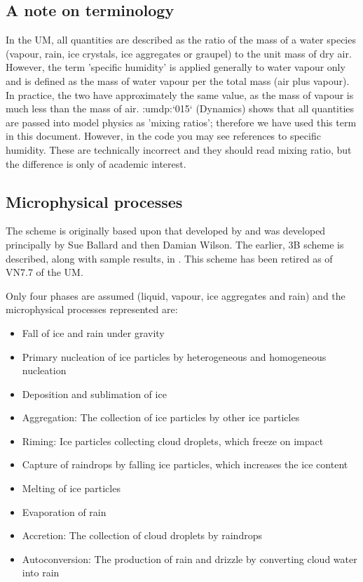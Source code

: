\documentclass{UMDP_article}
\newcommand{\citeumdp}[1]{:umdp:`#1`}
\begin{document}
\subsection{A note on terminology}
\label{sec:terms}
In the UM, all quantities are described as the ratio of the mass of a 
water species (vapour, rain, ice crystals, ice aggregates or graupel) to
the unit mass of dry air. However, the term 'specific humidity'
is applied generally to water vapour only and is defined as the mass of
water vapour per the total mass (air plus vapour). In practice, the two
have approximately the same value, as the mass of vapour is much less 
than the mass of air. \citeumdp{015} (Dynamics) shows that all quantities are
passed into model physics as 'mixing ratios'; therefore we have used this
term in this document. However, in the code you may see references to
specific humidity. These are technically incorrect and they should read
mixing ratio, but the difference is only of academic interest. 

\subsection{Microphysical processes}

The scheme is originally based upon that developed by \cite{Rutledge:Hobbs:1983} 
and was developed principally by Sue Ballard and then Damian Wilson. The earlier,
3B scheme is described, along with sample results, in \cite{Wilson:Ballard:1999}.
This scheme has been retired as of VN7.7 of the UM.

Only four phases are assumed (liquid, vapour, ice aggregates and rain) and 
the microphysical processes represented are:

\begin{itemize}
\item{Fall of ice and rain under gravity}
\item{Primary nucleation of ice particles by heterogeneous and homogeneous 
nucleation}
\item{Deposition and sublimation of ice}
\item{Aggregation: The collection of ice particles by other ice particles}
\item{Riming: Ice particles collecting cloud droplets, which freeze on impact}
\item{Capture of raindrops by falling ice particles, which increases the ice content} 
\item{Melting of ice particles}
\item{Evaporation of rain}
\item{Accretion: The collection of cloud droplets by raindrops}
\item{Autoconversion: The production of rain and drizzle by converting cloud water into rain}
\end{itemize}
\end{document}
